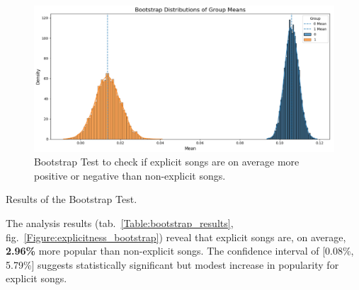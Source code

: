 \begin{center}
\begin{figure}[H]
  \centering
  \includegraphics[width=6in]{img/explicitness_bootstrap_2.png}
  \caption{Bootstrap Test to check if explicit songs are on average more
  positive or negative than non-explicit songs.}
  \label{Figure:explicitness_bootstrap_2}
\end{figure}
\end{center}



\begin{table}[H]
\centering
\caption{Results of the Bootstrap Test.}
\label{Table:bootstrap_results}
\end{table}

The analysis results (tab.~\ref{Table:bootstrap_results},
fig.~\ref{Figure:explicitness_bootstrap}) reveal that explicit songs are, on
average, \textbf{2.96\%} more popular than non-explicit songs. The confidence
interval of [0.08\%, 5.79\%] suggests statistically significant but modest
increase in popularity for explicit songs.


